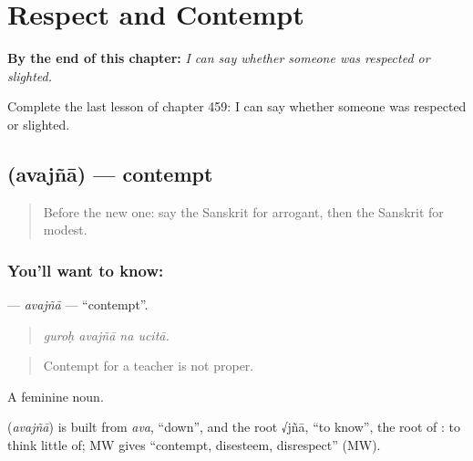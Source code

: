 
\chapter{Respect and Contempt}
\label{ch:sa-respect-and-contempt}

\begin{chapteropening}
\textbf{By the end of this chapter:} \emph{I can say whether someone was respected or slighted.}

Complete the last lesson of chapter 459: I can say whether someone was respected or slighted.
\end{chapteropening}

\section[\texorpdfstring{\sk{अवज्ञा} (avajñā)}{अवज्ञा (avajñā)}]{ (avajñā) — contempt}

\label{lesson:SA-C459-avajna}



\begin{quote}
Before the new one: say the Sanskrit for arrogant, then the Sanskrit for modest.
\end{quote}

\subsection*{You'll want to know: }
\textbf{} — \emph{avajñā} — \textquotedblleft{}contempt\textquotedblright{}.

\begin{quote}
   
\end{quote}

\begin{quote}
\emph{guroḥ avajñā na ucitā.}
\end{quote}

\begin{quote}
Contempt for a teacher is not proper.
\end{quote}

A feminine noun.

\begin{cousinweb}
\textbf{} (\emph{avajñā}) is built from \emph{ava}, \textquotedblleft{}down\textquotedblright{}, and the root √jñā, \textquotedblleft{}to know\textquotedblright{}, the root of \textbf{}: to think little of; MW gives \textquotedblleft{}contempt, disesteem, disrespect\textquotedblright{} (MW).
\end{cousinweb}

